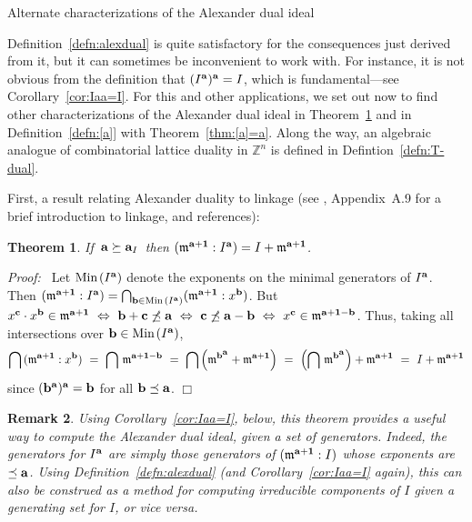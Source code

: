 \documentclass[12pt,leqno]{article}
\newtheorem{thm}{Theorem}[section]
\newtheorem{remark}[thm]{Remark}
\def\Min{{\rm Min}{\scriptscriptstyle \,}}
\def\aa{{{\rm \bf a}}}
\def\bb{{{\rm \bf b}}}
\def\cc{{{\rm \bf c}}}
\def\mm{{\mathfrak m}}
\def\ZZ{{\mathbb Z}}
\begin{document}
\begin{section}{Alternate characterizations of the Alexander dual ideal}%


\label{section:alternate}

\noindent
Definition~\ref{defn:alexdual} is quite satisfactory for the consequences
just derived from it, but it can sometimes be inconvenient to work with.
For instance, it is not obvious from the definition that $(I^\aa)^\aa =
I$, which is fundamental---see Corollary~\ref{cor:Iaa=I}.  For this and
other applications, we set out now to find other characterizations of the
Alexander dual ideal in Theorem~\ref{thm:linkage} and in
Definition~\ref{defn:[a]} with Theorem~\ref{thm:[a]=a}.  Along the way,
an algebraic analogue of combinatorial lattice duality in $\ZZ^n$ is
defined in Defintion~\ref{defn:T-dual}.

First, a result relating Alexander duality to linkage (see \cite{Vas},
Appendix~A.9 for a brief introduction to linkage, and references):
\begin{thm} \label{thm:linkage}
If $\,\aa \succeq \aa_I\,$ then $(\mm^{\aa+{\bf 1}} : I^\aa) = I +
\mm^{\aa + {\bf 1}}$.
\end{thm}
{\it Proof:\ } Let $\Min(I^\aa)$ denote the exponents on the minimal
generators of $I^\aa$.  Then $(\mm^{\aa + {\bf 1}} : I^\aa) =
\bigcap_{\bb \in \Min(I^\aa)} (\mm^{\aa + {\bf 1}} : x^\bb)$.  But $x^\cc
\cdot x^\bb \in \mm^{\aa + {\bf 1}} \ \Leftrightarrow\ \bb + \cc
\not\preceq \aa \ \Leftrightarrow\ \cc \not\preceq \aa - \bb \
\Leftrightarrow\ x^\cc \in \mm^{\aa + {\bf 1} - \bb}$.  Thus, taking all
intersections over $\bb \in \Min(I^\aa)$,
$$
  \bigcap\,(\mm^{\aa + {\bf 1}} : x^\bb)
\ =\ 
  \bigcap\,\mm^{\aa + {\bf 1} - \bb}
\ =\
  \bigcap\,\Bigl( \mm^{\bb^{\scriptstyle \aa}} + \mm^{\aa + {\bf 1}}
  \Bigr)
\ =\
  \Bigl( \bigcap\,\mm^{\bb^{\scriptstyle \aa}} \Bigr) + \mm^{\aa + {\bf
  1}}
\ =\
  I + \mm^{\aa + {\bf 1}}
$$
since $(\bb^\aa)^\aa = \bb$ for all $\bb \preceq \aa$.
%
\hfill
$\Box$
\vskip 2mm 
\noindent
\begin{remark} \rm
Using Corollary~\ref{cor:Iaa=I}, below, this theorem provides a useful
way to compute the Alexander dual ideal, given a set of generators.
Indeed, the generators for $I^\aa$ are simply those generators of
$(\mm^{\aa + {\bf 1}} : I)$ whose exponents are $\preceq \aa$.  Using
Definition~\ref{defn:alexdual} (and Corollary~\ref{cor:Iaa=I} again),
this can also be construed as a method for computing irreducible
components of $I$ given a generating set for $I$, or vice versa.
\end{remark}


\end{section}
\end{document}
